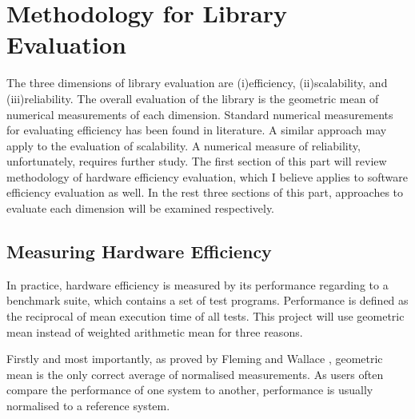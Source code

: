 \section{Methodology for Library Evaluation}

The three dimensions of library evaluation are (i)efficiency, (ii)scalability, and (iii)reliability.    The overall evaluation of the library is the geometric mean of numerical measurements of each dimension.  Standard numerical measurements  for evaluating efficiency has been found in literature.  A similar approach may apply to the evaluation of scalability.  A numerical measure of reliability, unfortunately, requires further study.  The first section of this part will review methodology of hardware efficiency evaluation, which I believe applies to software efficiency evaluation as well.  In the rest three sections of this part, approaches to evaluate each dimension will be examined respectively.

\subsection{Measuring Hardware Efficiency}
In practice, hardware efficiency is measured by its performance regarding to a benchmark suite, which contains a set of test programs.  Performance is defined as the reciprocal of mean execution time of all tests\cite{HePa06}.  This project will use geometric mean instead of weighted arithmetic mean for three reasons.

Firstly and most importantly, as proved by Fleming and Wallace \cite{Fleming}, geometric mean is the only correct average of normalised measurements.  As users often compare the performance of one system to another, performance is usually normalised to a reference system.  

\begin{comment}
 Precisely, let the benchmark suite has $n$ tests indexed from $1$ to $n$, performance of system A is calculated as:

 $performance_A$ 
= $\frac{time_{ref}}{time_{A}}$
= $\frac{\sqrt[n]{\prod^{n}_{i=1} time_{ref_i}}}{\sqrt[n]{\prod^{n}_{i=1} time_{A_i}}}$
= $\sqrt[n]{\prod^{n}_{i=1}{\frac{time_{ref_i}}{time_{A_i}}}}$

\hspace{0.8 cm}where $time_{S_i}$ is the execution time of program $i$ on system $S$, 

\hspace{1.0 cm} and $time_{S}$ is the time measurement of system $S$.
\end{comment}

